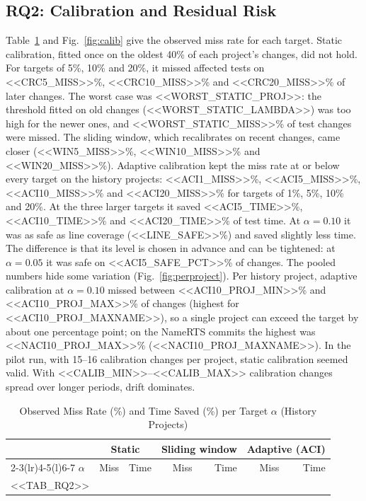 \documentclass[conference]{IEEEtran}
\begin{document}
\subsection{RQ2: Calibration and Residual Risk}
Table~\ref{tab:rq2} and Fig.~\ref{fig:calib} give the observed miss rate for each target. Static calibration, fitted once on the oldest 40\% of each project's changes, did not hold. For targets of 5\%, 10\% and 20\%, it missed affected tests on <<CRC5_MISS>>\%, <<CRC10_MISS>>\% and <<CRC20_MISS>>\% of later changes. The worst case was <<WORST_STATIC_PROJ>>: the threshold fitted on old changes (<<WORST_STATIC_LAMBDA>>) was too high for the newer ones, and <<WORST_STATIC_MISS>>\% of test changes were missed. The sliding window, which recalibrates on recent changes, came closer (<<WIN5_MISS>>\%, <<WIN10_MISS>>\% and <<WIN20_MISS>>\%). Adaptive calibration kept the miss rate at or below every target on the history projects: <<ACI1_MISS>>\%, <<ACI5_MISS>>\%, <<ACI10_MISS>>\% and <<ACI20_MISS>>\% for targets of 1\%, 5\%, 10\% and 20\%. At the three larger targets it saved <<ACI5_TIME>>\%, <<ACI10_TIME>>\% and <<ACI20_TIME>>\% of test time. At $\alpha=0.10$ it was as safe as line coverage (<<LINE_SAFE>>\%) and saved slightly less time. The difference is that its level is chosen in advance and can be tightened: at $\alpha=0.05$ it was safe on <<ACI5_SAFE_PCT>>\% of changes. The pooled numbers hide some variation (Fig.~\ref{fig:perproject}). Per history project, adaptive calibration at $\alpha=0.10$ missed between <<ACI10_PROJ_MIN>>\% and <<ACI10_PROJ_MAX>>\% of changes (highest for <<ACI10_PROJ_MAXNAME>>), so a single project can exceed the target by about one percentage point; on the NameRTS commits the highest was <<NACI10_PROJ_MAX>>\% (<<NACI10_PROJ_MAXNAME>>). In the pilot run, with 15--16 calibration changes per project, static calibration seemed valid. With <<CALIB_MIN>>--<<CALIB_MAX>> calibration changes spread over longer periods, drift dominates.

\begin{table}[t]
\caption{Observed Miss Rate (\%) and Time Saved (\%) per Target $\alpha$ (History Projects)}
\label{tab:rq2}
\centering
\footnotesize
\setlength{\tabcolsep}{3pt}
\begin{tabular}{@{}lrrrrrr@{}}
\toprule
& \multicolumn{2}{c}{\textbf{Static}} & \multicolumn{2}{c}{\textbf{Sliding window}} & \multicolumn{2}{c}{\textbf{Adaptive (ACI)}} \\
\cmidrule(lr){2-3}\cmidrule(lr){4-5}\cmidrule(l){6-7}
$\alpha$ & Miss & Time & Miss & Time & Miss & Time \\
\midrule
<<TAB_RQ2>>
\bottomrule
\end{tabular}
\end{table}
\end{document}
